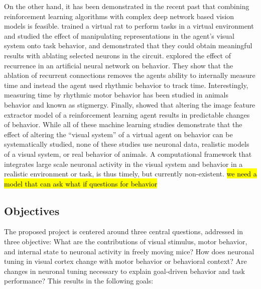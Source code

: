 \documentclass[B2,COG]{ercgrant}
\begin{document}
On the other hand, it has been demonstrated in the recent past that combining reinforcement learning algorithms with complex deep network based vision models is feasible. 
\textcite{Merel2020-hf} trained a virtual rat to perform tasks in a virtual environment and studied the effect of manipulating representations in the agent's visual system onto task behavior, and demonstrated that they could obtain meaningful results with ablating selected neurons in the circuit. 
\textcite{Deverett2019-gs} explored the effect of recurrence in an artificial neural network on behavior. 
They show that the ablation of recurrent connections removes the agents ability to internally measure time and instead the agent used rhythmic behavior to track time. 
Interestingly, measuring time by rhythmic motor behavior has been studied in animals behavior and known as stigmergy.
Finally, \textcite{Hilton2020-jz} showed that altering the image feature extractor model of a reinforcement learning agent results in predictable changes of behavior.
While all of these machine learning studies demonstrate that the effect of altering the ``visual system'' of a virtual agent on behavior can be systematically studied, none of these studies use neuronal data, realistic models of a visual system, or real behavior of animals. 
A computational framework that integrates large scale neuronal activity in the visual system and behavior in a realistic environment or task, is thus timely, but currently non-existent. 
\hl{we need a model that can ask what if questions for behavior}
\subsection{Objectives}
The proposed project is centered around three central questions, addressed in three objective:
 What are the contributions of visual stimulus, motor behavior, and internal state to neuronal activity in freely moving mice?
 How does neuronal tuning in visual cortex change with motor behavior or behavioral context?
 Are changes in neuronal tuning necessary to explain goal-driven behavior and task performance?
This results in the following goals:
\end{document}
